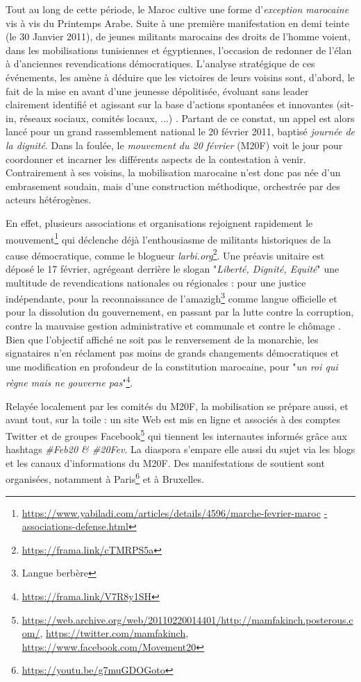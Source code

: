 \documentclass[symmetric,justified,marginals=raggedouter]{tufte-book}
\begin{document}
\noindent Tout au long de cette période, le Maroc cultive une forme d'\textit{exception marocaine} vis à vis du Printemps Arabe. Suite à une première manifestation en demi teinte (le 30 Janvier 2011), de jeunes militants marocains des droits de l'homme voient, dans les mobilisations tunisiennes et égyptiennes, l'occasion de redonner de l'élan à d'anciennes revendications démocratiques. L'analyse stratégique de ces événements, les amène à déduire que les victoires de leurs voisins sont, d'abord, le fait de la mise en avant d'une jeunesse dépolitisée, évoluant sans leader clairement identifié et agissant sur la base d'actions spontanées et innovantes (sit-in, réseaux sociaux, comités locaux, ...) \citep{bennani-chraibi_dynamique_2012}. Partant de ce constat, un appel est alors lancé pour un grand rassemblement national le 20 février 2011, baptisé \textit{journée de la dignité}. Dans la foulée, le \textit{mouvement du 20 février} (M20F) voit le jour pour coordonner et incarner les différents aspects de la contestation à venir. Contrairement à ses voisins, la mobilisation marocaine n'est donc pas née d'un embrasement soudain, mais d'une construction méthodique, orchestrée par des acteurs hétérogènes.

En effet, plusieurs associations et organisations rejoignent rapidement le mouvement\footnote{\url{https://www.yabiladi.com/articles/details/4596/marche-fevrier-maroc} \url{-associations-defense.html}} qui déclenche déjà l'enthousiasme de militants historiques de la cause démocratique, comme le blogueur \textit{larbi.org}\footnote{\url{https://frama.link/cTMRPS5a}}. Une préavis unitaire est déposé le 17 février, agrégeant derrière le slogan "\textit{Liberté, Dignité, Equité}" une multitude de revendications nationales ou régionales : pour une justice indépendante, pour la reconnaissance de l'amazigh\footnote{Langue berbère } comme langue officielle et pour la dissolution du gouvernement, en passant par la lutte contre la corruption, contre la mauvaise gestion administrative et communale et contre le chômage \citep{bennafla_maroc_2011}. Bien que l'objectif affiché ne soit pas le renversement de la monarchie, les signataires n'en réclament pas moins de grands changements démocratiques et une modification en profondeur de la constitution marocaine, pour "\textit{un roi qui règne mais ne gouverne pas}"\footnote{\url{https://frama.link/V7R8y1SH}}.

Relayée localement par les comités du M20F, la mobilisation se prépare aussi, et avant tout, sur la toile : un site Web est mis en ligne et associés à des comptes Twitter et de groupes Facebook\footnote{\url{https://web.archive.org/web/20110220014401/http://mamfakinch.posterous.com/}, \url{https://twitter.com/mamfakinch}, \url{https://www.facebook.com/Movement20}} qui tiennent les internautes informés grâce aux hashtags \textit{\#Feb20 \& \#20Fev}. La diaspora s'empare elle aussi du sujet via les blogs et les canaux d'informations du M20F. Des manifestations de soutient sont organisées, notamment à Paris\footnote{\url{https://youtu.be/g7muGDOGoto}} et à Bruxelles. 
\end{document}
